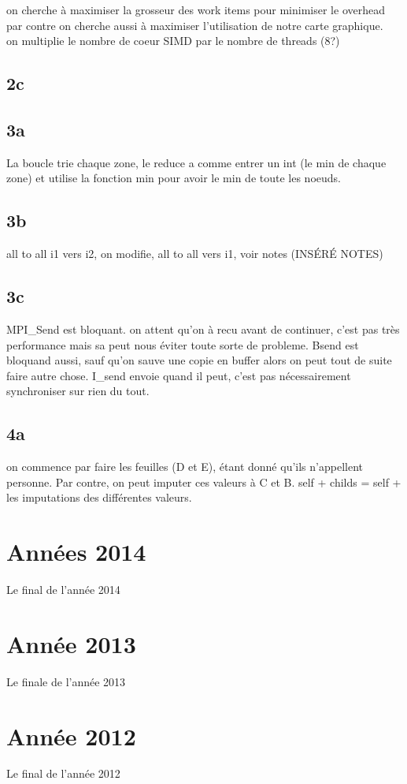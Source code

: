 \documentclass[oneside]{book}
\begin{document}
on cherche à maximiser la grosseur des work items pour minimiser le overhead par contre on cherche aussi à maximiser l'utilisation de notre carte graphique.\\

on multiplie le nombre de coeur SIMD par le nombre de threads (8?)
\subsection{2c}
\subsection{3a}
La boucle trie chaque zone, le reduce a comme entrer un int (le min de chaque zone) et utilise la fonction min pour avoir le min de toute les noeuds.
\subsection{3b}
all to all i1 vers i2, on modifie, all to all vers i1, voir notes (INSÉRÉ NOTES)

\subsection{3c}
MPI\_Send est bloquant. on attent qu'on à recu avant de continuer, c'est pas très performance mais sa peut nous éviter toute sorte de probleme. Bsend est bloquand aussi, sauf qu'on sauve une copie en buffer alors on peut tout de suite faire autre chose. I\_send envoie quand il peut, c'est pas nécessairement synchroniser sur rien du tout.

\subsection{4a}
on commence par faire les feuilles (D et E), étant donné qu'ils n'appellent personne. Par contre, on peut imputer ces valeurs à C et B. self + childs  = self + les imputations des différentes valeurs.


\section{Années 2014}
Le final de l'année 2014

\section{Année 2013}
Le finale de l'année 2013

\section{Année 2012}
Le final de l'année 2012

\end{document}
